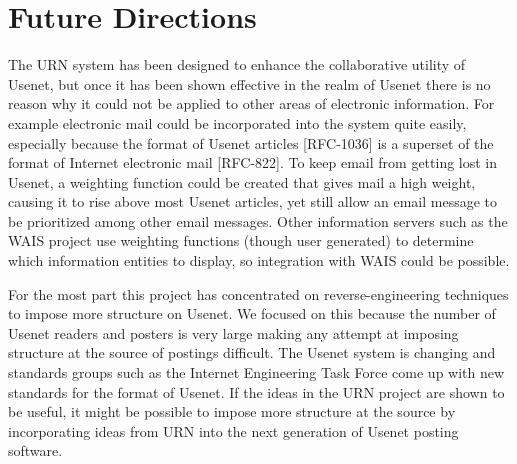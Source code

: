 \section{Future Directions}

The URN system has been designed to enhance the collaborative utility of
Usenet, but once it has been shown effective in the realm of Usenet there is no
reason why it could not be applied to other areas of electronic information.
For example electronic mail could be incorporated into the system quite easily,
especially because the format of Usenet articles [RFC-1036] is a superset of
the format of Internet electronic mail [RFC-822]. To keep email from getting
lost in Usenet, a weighting function could be created that gives mail a high
weight, causing it to rise above most Usenet articles, yet still allow an email
message to be prioritized among other email messages. Other information servers
such as the WAIS project use weighting functions (though user
generated) to determine which information entities to display, so integration
with WAIS could be possible.

For the most part this project has concentrated on reverse-engineering
techniques to impose more structure on Usenet. We focused on this because
the number of Usenet readers and posters is very large making any attempt at
imposing structure at the source of postings difficult. The Usenet system is
changing and standards groups such as the Internet Engineering Task Force
come up with new standards for the format of Usenet. If the ideas in the URN
project are shown to be useful, it might be possible to impose more
structure at the source by incorporating ideas from URN into the next
generation of Usenet posting software.






